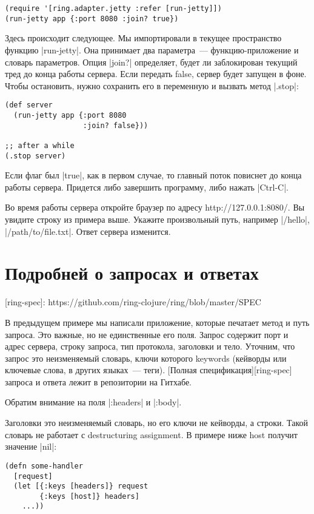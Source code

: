 \begin{verbatim}
(require '[ring.adapter.jetty :refer [run-jetty]])
(run-jetty app {:port 8080 :join? true})
\end{verbatim}

Здесь происходит следующее. Мы импортировали в текущее пространство функцию
\spverb|run-jetty|. Она принимает два параметра~--- функцию-приложение и словарь
параметров. Опция \spverb|join?| определяет, будет ли заблокирован текущий тред до
конца работы сервера. Если передать false, сервер будет запущен в фоне. Чтобы
остановить, нужно сохранить его в переменную и вызвать метод \spverb|.stop|:

\begin{verbatim}
(def server
  (run-jetty app {:port 8080
                  :join? false}))

;; after a while
(.stop server)
\end{verbatim}

Если флаг был \spverb|true|, как в первом случае, то главный поток повиснет до конца
работы сервера. Придется либо завершить программу, либо нажать \spverb|Ctrl-C|.

Во время работы сервера откройте браузер по адресу http://127.0.0.1:8080/. Вы
увидите строку из примера выше. Укажите произвольный путь, например \spverb|/hello|,
\spverb|/path/to/file.txt|. Ответ сервера изменится.


\section{Подробней о запросах и ответах}

[ring-spec]: https://github.com/ring-clojure/ring/blob/master/SPEC

В предыдущем примере мы написали приложение, которые печатает метод и путь
запроса. Это важные, но не единственные его поля. Запрос содержит порт и адрес
сервера, строку запроса, тип протокола, заголовки и тело. Уточним, что запрос
это неизменяемый словарь, ключи которого keywords (кейворды или ключевые слова,
в других языках~--- теги). [Полная спецификация][ring-spec] запроса и ответа лежит
в репозитории на Гитхабе.

Обратим внимание на поля \spverb|:headers| и \spverb|:body|.

Заголовки это неизменяемый словарь, но его ключи не кейворды, а строки. Такой
словарь не работает с destructuring assignment. В примере ниже host получит
значение \spverb|nil|:

\begin{verbatim}
(defn some-handler
  [request]
  (let [{:keys [headers]} request
        {:keys [host]} headers]
    ...))
\end{verbatim}

